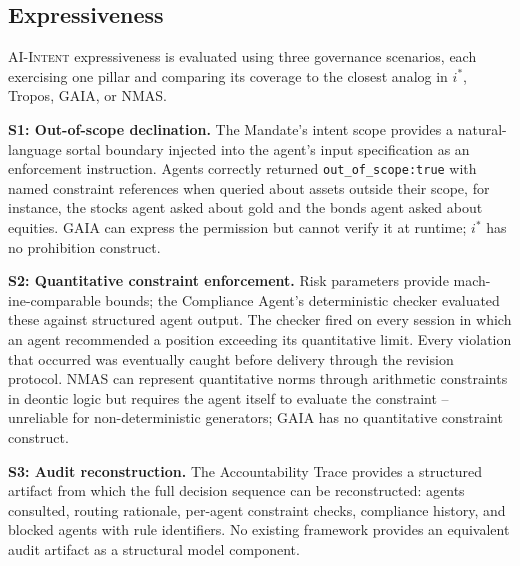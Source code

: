 \documentclass[runningheads]{llncs}
\begin{document}
\subsection{Expressiveness}
\label{sec:expressiveness}

\textsc{AI-Intent} expressiveness is evaluated using three governance scenarios, each exercising one pillar and comparing its coverage to the closest analog in $i^*$, Tropos, GAIA, or NMAS.

\textbf{S1: Out-of-scope declination.} The Mandate's intent scope
provides a natural-language sortal boundary injected into the agent's input specification as an enforcement instruction. Agents correctly returned \texttt{out\_of\_scope:true} with named constraint references when queried about assets outside their scope, for instance, the stocks agent asked about gold and the bonds agent asked about equities.
GAIA can express the permission but cannot verify it at runtime; $i^*$ has no prohibition construct.

\textbf{S2: Quantitative constraint enforcement.} Risk parameters
provide mach-ine-comparable bounds; the Compliance Agent's deterministic checker evaluated these against structured agent output. The checker fired on every session in which an agent recommended a position exceeding its quantitative limit. Every violation that occurred was eventually caught before delivery through the revision protocol. 
NMAS can represent quantitative norms through arithmetic constraints in deontic logic but requires the agent itself to evaluate the constraint -- unreliable for non-deterministic generators; GAIA has no quantitative constraint construct.

\textbf{S3: Audit reconstruction.} The Accountability Trace provides a structured artifact from which the full decision sequence can be reconstructed: agents consulted, routing rationale, per-agent constraint checks, compliance history, and blocked agents with rule identifiers.
No existing framework provides an equivalent audit artifact as a structural model component.
\end{document}

